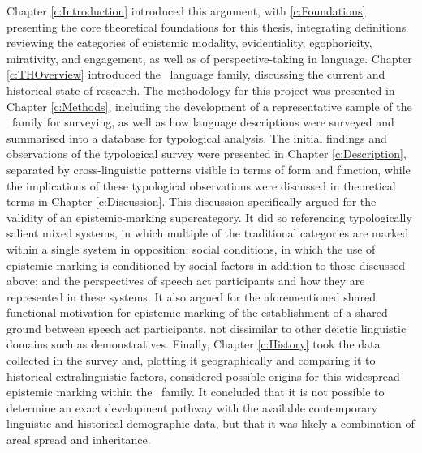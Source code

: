 Chapter \ref{c:Introduction} introduced this argument, with \cref{c:Foundations} presenting the core theoretical foundations for this thesis, integrating definitions reviewing the categories of epistemic modality, evidentiality, egophoricity, mirativity, and engagement, as well as of perspective-taking in language. Chapter \ref{c:THOverview} introduced the \lfam\ language family, discussing the current and historical state of research. The methodology for this project was presented in Chapter \ref{c:Methods}, including the development of a representative sample of the \lfam\ family for surveying, as well as how language descriptions were surveyed and summarised into a database for typological analysis. The initial findings and observations of the typological survey were presented in Chapter \ref{c:Description}, separated by cross-linguistic patterns visible in terms of form and function, while the implications of these typological observations were discussed in theoretical terms in Chapter \ref{c:Discussion}. This discussion specifically argued for the validity of an epistemic-marking supercategory. It did so referencing typologically salient mixed systems, in which multiple of the traditional categories are marked within a single system in opposition; social conditions, in which the use of epistemic marking is conditioned by social factors in addition to those discussed above; and the perspectives of speech act participants and how they are represented in these systems. It also argued for the aforementioned shared functional motivation for epistemic marking of the establishment of a shared ground between speech act participants, not dissimilar to other deictic linguistic domains such as demonstratives. Finally, Chapter \ref{c:History} took the data collected in the survey and, plotting it geographically and comparing it to historical extralinguistic factors, considered possible origins for this widespread epistemic marking within the \lfam\ family. It concluded that it is not possible to determine an exact development pathway with the available contemporary linguistic and historical demographic data, but that it was likely a combination of areal spread and inheritance.

